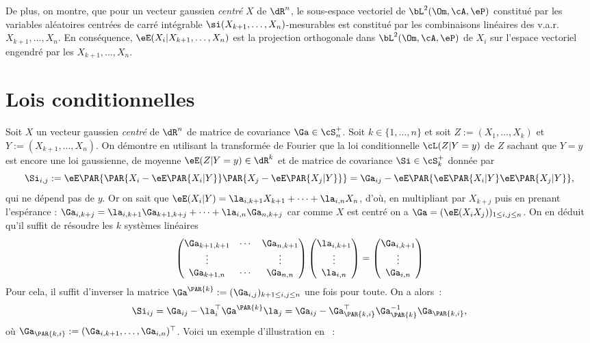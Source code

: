 De plus, on montre, que pour un vecteur gaussien \emph{centré} $X$ de $\dR^n$,
le sous-espace vectoriel de $\bL^2(\Om,\cA,\eP)$ constitué par les variables
aléatoires centrées de carré intégrable $\si(X_{k+1},\ldots,X_n)$-mesurables
est constitué par les combinaisons linéaires des v.a.r. $X_{k+1},\ldots,X_n$.
En conséquence, $\eE(X_i\vert X_{k+1},\ldots,X_n)$ est la projection
orthogonale dans $\bL^2(\Om,\cA,\eP)$ de $X_i$ sur l'espace vectoriel engendré
par les $X_{k+1},\ldots,X_n$.

\section{Lois conditionnelles}

Soit $X$ un vecteur gaussien \emph{centré} de $\dR^n$ de matrice de covariance
$\Ga\in\cS_n^+$. Soit $k\in\{1,\ldots,n\}$ et soit $Z:=(X_1,\ldots,X_k)$ et
$Y:=(X_{k+1},\ldots,X_n)$. On démontre en utilisant la transformée de Fourier
que la loi conditionnelle $\cL(Z\vert Y=y)$ de $Z$ sachant que $Y=y$ est
encore une loi gaussienne, de moyenne $\eE(Z\vert Y=y)\in\dR^k$ et de matrice
de covariance $\Si\in\cS^+_k$ donnée par
$$
\Si_{i,j}:=\eE\PAR{\PAR{X_i-\eE\PAR{X_i\vert Y}}\PAR{X_j-\eE\PAR{X_j\vert
      Y}}} = \Ga_{ij}-\eE\PAR{\eE\PAR{X_i\vert Y}\eE\PAR{X_j\vert Y}},
$$
qui ne dépend pas de $y$. Or on sait que $\eE(X_i\vert Y)=\la_{i,k+1}
X_{k+1}+\cdots+\la_{i,n} X_n$, d'où, en multipliant par $X_{k+j}$ puis en
prenant l'espérance : $\Ga_{i,k+j}=\la_{i,k+1} \Ga_{k+1,k+j}+\cdots+\la_{i,n}
\Ga_{n,k+j}$ car comme $X$ est centré on a $\Ga=(\eE(X_i X_j))_{1\leq i,j \leq
  n}$. On en déduit qu'il suffit de résoudre les $k$ systèmes linéaires
$$
\begin{pmatrix} \Ga_{k+1,k+1} & \cdots & \Ga_{n,k+1} \\ 
                \vdots        &        & \vdots \\ 
                \Ga_{k+1,n}   & \cdots & \Ga_{n,n}
\end{pmatrix}
\begin{pmatrix} \la_{i,k+1} \\ \vdots \\ \la_{i,n}\end{pmatrix} 
=\begin{pmatrix} \Ga_{i,k+1} \\ \vdots \\ \Ga_{i,n}\end{pmatrix}
$$
Pour cela, il suffit d'inverser la matrice
$\Ga^{\PAR{k}}:=(\Ga_{i,j})_{k+1\leq i,j \leq n}$ une fois pour toute. On a
alors~:
$$
\Si_{ij}=\Ga_{ij}-\la_i^\top\Ga^\PAR{k}\la_j
        =\Ga_{ij}-\Ga_\PAR{k,i}^\top \Ga_\PAR{k}^{-1} \Ga_\PAR{k,i},
$$
où $\Ga_\PAR{k,i}:=(\Ga_{i,k+1},\ldots,\Ga_{i,n})^\top$. Voici un
exemple d'illustration en \ML{}~:
%
%
%

